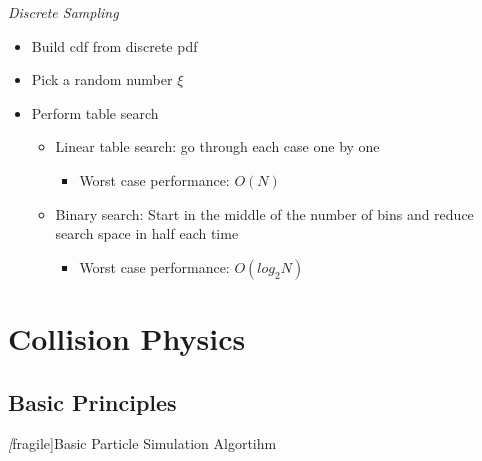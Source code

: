 \emph{}
\begin{figure}[htbp]
  \centering
\end{figure}


\emph{Discrete Sampling}
 \begin{itemize}
  \item Build cdf from discrete pdf
  \item Pick a random number $\xi$
  \item Perform table search
  \begin{itemize}
   \item Linear table search: go through each case one by one
   \begin{itemize}
    \item Worst case performance: $O(N)$
   \end{itemize}
   \item Binary search: Start in the middle of the number of bins and reduce search space in half each time
   \begin{itemize}
    \item Worst case performance: $O(log_{2}N)$
   \end{itemize}
  \end{itemize}
 \end{itemize}


\section{Collision Physics}

\subsection{Basic Principles}

\emph[fragile]{Basic Particle Simulation Algortihm}

\begin{algorithm}[H]
    \tiny
\end{algorithm}



